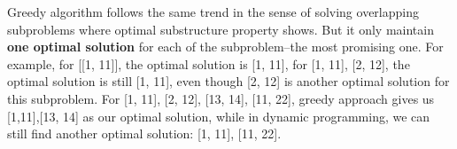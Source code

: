 \documentclass[../main.tex]{subfiles}
\begin{document}
Greedy algorithm follows the same trend in the sense of solving overlapping subproblems where  optimal substructure property shows. But it only maintain  \textbf{one optimal solution} for each of the subproblem--the most promising one. For example, for [[1, 11]], the optimal solution is [1, 11], for [1, 11], [2, 12], the optimal solution is still [1, 11], even though [2, 12] is another optimal solution for this subproblem.  For [1, 11], [2, 12], [13, 14], [11, 22], greedy approach gives us [1,11],[13, 14] as our optimal solution, while in dynamic programming, we can still find another optimal solution: [1, 11], [11, 22]. 
\end{document}
